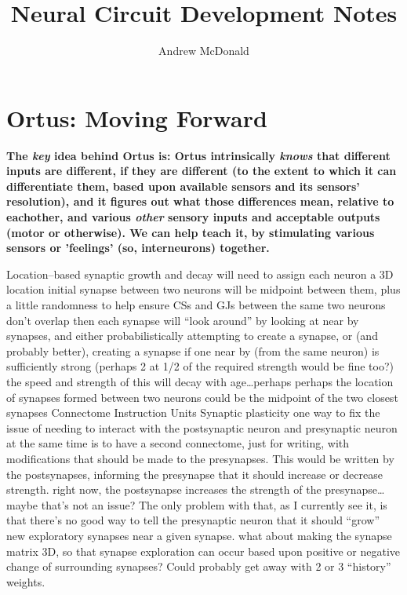 \documentclass[11pt, a4paper, oneside]{article}   	%
\title{Neural Circuit Development Notes}
\author{Andrew McDonald}
\begin{document}
\maketitle
\hypersetup{linkcolor=blue}
\tableofcontents
\hypersetup{linkcolor=blue}
\listoffigures
\hypersetup{linkcolor=blue} %

\section{Ortus: Moving Forward}

\textbf{The \textit{key} idea behind Ortus is: Ortus intrinsically \textit{knows} that different inputs are different, if they are different (to the extent to which it can differentiate them, based upon available sensors and its sensors' resolution), and it figures out what those differences mean, relative to eachother, and various \textit{other} sensory inputs and acceptable outputs (motor or otherwise). We can help teach it, by stimulating various sensors or 'feelings' (so, interneurons) together.}

\begin{outline}
    \point Location--based synaptic growth and decay
        \subpoint will need to assign each neuron a 3D location
            \subsubpoint initial synapse between two neurons will be midpoint between them, plus a little randomness to help ensure CSs and GJs between the same two neurons don't overlap
        \subpoint then each synapse will ``look around'' by looking at near by synapses, and either probabilistically attempting to create a synapse, or (and probably better), creating a synapse if one near by (from the same neuron) is sufficiently strong (perhaps 2 at 1/2 of the required strength would be fine too?)
            \subsubpoint the speed and strength of this will decay with age\ldots perhaps
        \subpoint perhaps the location of synapses formed between two neurons could be the midpoint of the two closest synapses 
    \point Connectome Instruction Units
    \point Synaptic plasticity
        \subpoint one way to fix the issue of needing to interact with the postsynaptic neuron and presynaptic neuron at the same time is to have a second connectome, just for writing, with modifications that should be made to the presynapses. This would be written by the postsynapses, informing the presynapse that it should increase or decrease strength.
            \subsubpoint right now, the postsynapse increases the strength of the presynapse\ldots maybe that's not an issue? The only problem with that, as I currently see it, is that there's no good way to tell the presynaptic neuron that it should ``grow'' new exploratory synapses near a given synapse. 
                \supersubpoint what about making the synapse matrix 3D, so that synapse exploration can occur based upon positive or negative change of surrounding synapses? Could probably get away with 2 or 3 ``history'' weights.
\end{outline}
\end{document}
